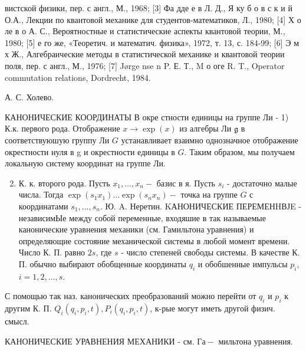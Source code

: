 \documentclass[10pt]{article}
\begin{document}
вистской физики, пер. с англ., М., 1968; [3] Фа дде е в Л. Д., Я ку б о в с к и й О.А., Лекции по квантовой механике для студентов-математиков, Л., 1980; [4] Х о ле в о А. С., Вероятностные и статистические аспекты квантовой теории, М., 1980; [5] е го же, «Теоретич. и математич. физика», 1972, т. 13, с. 184-99; [6] Э м х Ж., Алгебраические методы в статистической механике и квантовой теории поля, пер. с англ., М., 1976; [7] Jørge nse n P. Е. Т., M о оге R. T., Operator commutation relations, Dordrecht, 1984.



А. С. Холево.



КАНОНИЧЕСКИЕ КООРДИНАТЫ В окре стности единицы на группе Ли - 1) К.к. первого рода. Отображение $x \rightarrow \exp (x)$ из алгебры Ли $\mathfrak{g}$ в соответствуюшую группу Ли $G$ устанавливает взаимно однозначное отображение окрестности нуля в g и окрестности единицы в $G$. Таким образом, мы получаем локальную систему координат на группе Ли.



\begin{enumerate}

  \setcounter{enumi}{1}

  \item К. к. второго рода. Пусть $x_{1}, \ldots, x_{n}-$ базис в я. Пусть $s_{i}$ - достаточно малые числа. Тогда $\exp \left(s_{1} x_{1}\right) \ldots \exp \left(s_{n} x_{n}\right)-$ точка на группе $G$ с координатами $s_{1}, \ldots, s_{n}$. Ю. A. Неретин. KАНОНИЧЕСКИЕ ПЕРЕМЕНHВЈE - независимЫе между собой переменные, входяшие в так называемые канонические уравнения механики (см. Гамильтона уравнения) и определяющие состояние механической системы в любой момент времени. Число К. П. равно $2 s$, где $s$ - число степеней свободы системы. В качестве К. П. обычно выбирают обобщенные координаты $q_{i}$ и обобшенные импульсы $p_{i}$, $i=1,2, \ldots, s$.

\end{enumerate}



С помощью так наз. канонических преобразований можно перейти от $q_{i}$ и $p_{i}$ к другим К. П. $Q_{i}\left(q_{i}, p_{i}, t\right), P_{i}\left(q_{i}, p_{i}, t\right)$, к-рые могут иметь другой физич. смысл.



КАНОНИЧЕСКИЕ УРАВНЕНИЯ МЕХАНИКИ - см. $Г а-$ мильтона уравнения.
\end{document}
